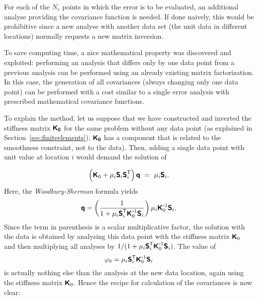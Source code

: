For each of the $N_c$ points in which the error is to be evaluated, an additional analyse providing the covariance function is needed. If done naively, this would be prohibitive since a new analyse with another data set (the unit data in different locations) normally requests a new matrix inversion. 

To save computing time, a nice mathematical property was discovered and exploited: performing an analysis that differs only by one data point from a previous analysis can be performed using an already existing matrix factorization. In this case, the generation of all covariances (always changing only one data point) can be performed with a cost similar to a single error analysis with prescribed mathematical covariance functions.

To explain the method, let us suppose that we have constructed and inverted the stiffness matrix $\mbox{\boldmath $ \protect\mathsf{K_0} $}$ for the same problem without any data point (as explained in Section~\ref{sec:finiteelements}), $\mbox{\boldmath $ \protect\mathsf{K_0} $}$ has a component that is related to the smoothness constraint, not to the data). Then, adding a single data point with unit value at location $i$ would demand the solution of 

\begin{equation}
\left( \mbox{\boldmath $ \protect\mathsf{K} $}_0 + \mu_i \mbox{\boldmath $ \protect\mathsf{S} $}_i {\mbox{\boldmath $ \protect\mathsf{S} $}}^\mathsf{T}_i \right) \mbox{\boldmath $ \protect\mathsf{q} $} ~=~ \mu_i \mbox{\boldmath $ \protect\mathsf{S} $}_i.
\end{equation}
Here, the \textit{Woodbury-Sherman} formula yields
\begin{equation}
\mbox{\boldmath $ \protect\mathsf{q} $}=\left( 1 \over 1 + \mu_i {\mbox{\boldmath $ \protect\mathsf{S} $}}^\mathsf{T}_i {\mbox{\boldmath $ \protect\mathsf{K} $}}^{ \mbox{\small{-}} 1}_0 \mbox{\boldmath $ \protect\mathsf{S} $}_i \right) \mu_i {\mbox{\boldmath $ \protect\mathsf{K} $}}^{ \mbox{\small{-}} 1}_0 \mbox{\boldmath $ \protect\mathsf{S} $}_i.
\label{eq:qwoodone}
\end{equation}
Since the term in parenthesis is a scalar multiplicative factor, the solution with the data is obtained by analysing this data point with the stiffness matrix $\mbox{\boldmath $ \protect\mathsf{K} $}_0$ and then multiplying all analyses by $ 1 /( 1 + \mu_i {\mbox{\boldmath $ \protect\mathsf{S} $}}^\mathsf{T}_i {\mbox{\boldmath $ \protect\mathsf{K} $}}^{ \mbox{\small{-}} 1}_0 \mbox{\boldmath $ \protect\mathsf{S} $}_i)$.
The value of 
\begin{equation} 
\varphi_0 = \mu_i {\mbox{\boldmath $ \protect\mathsf{S} $}}^\mathsf{T}_i {\mbox{\boldmath $ \protect\mathsf{K} $}}^{ \mbox{\small{-}} 1}_0 \mbox{\boldmath $ \protect\mathsf{S} $}_i
\end{equation}
is actually nothing else than the analysis at the new data location, again using the stiffness matrix $\mbox{\boldmath $ \protect\mathsf{K} $}_0$.
Hence the recipe for calculation of the covariances is now clear: 

